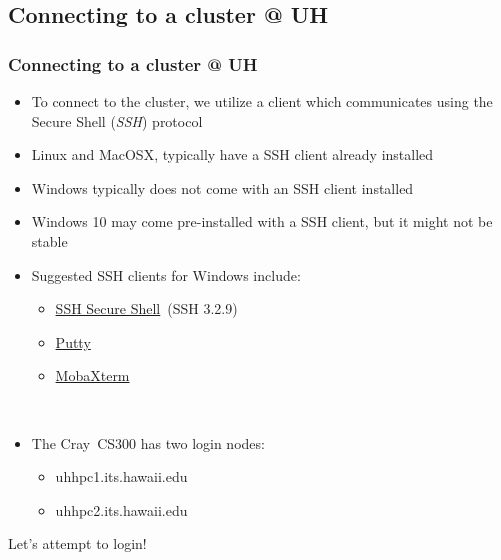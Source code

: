 \documentclass[t,hyperref={pdfpagelabels=false}]{beamer}
\newcommand{\craycs}{Cray~CS300}
\begin{document}
\subsection{Connecting to a cluster @ UH}
\begin{frame}
	\frametitle{Connecting to a cluster @ UH}
	\begin{description}[\setlength{\leftmargini}{0pt}]
	\item[] \begin{itemize}
		\item To connect to the cluster, we utilize a client which communicates using the Secure Shell (\emph{SSH}) protocol 
		\item Linux and MacOSX, typically have a SSH client already installed
		\item Windows typically does not come with an SSH client installed
		\item Windows 10 may come pre-installed with a SSH client, but it might not be stable
		\item Suggested SSH clients for Windows include:
		\begin{itemize}
			\item \href{http://www.hawaii.edu/askus/685}{SSH Secure Shell}~(SSH 3.2.9)
			\item \href{http://www.chiark.greenend.org.uk/~sgtatham/putty/download.html}{Putty}
                        \item \href{http://mobaxterm.mobatek.net/}{MobaXterm}
		\end{itemize}
	\end{itemize}
	\item[] ~\\
	\item[] \begin{itemize}
		\item The {\craycs} has two login nodes:
		\begin{itemize}
			\item uhhpc1.its.hawaii.edu
			\item uhhpc2.its.hawaii.edu
		\end{itemize}
	\end{itemize}
	\end{description}
	{\large Let's attempt to login!}
\end{frame}
\end{document}

